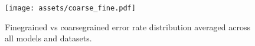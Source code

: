 \begin{figure}
    \centering
    \texttt{[image: assets/coarse\_fine.pdf]}
    \caption{Finegrained vs coarsegrained error rate distribution averaged across all models and datasets.}
    \label{fig:pie_finegrained}
\end{figure}

